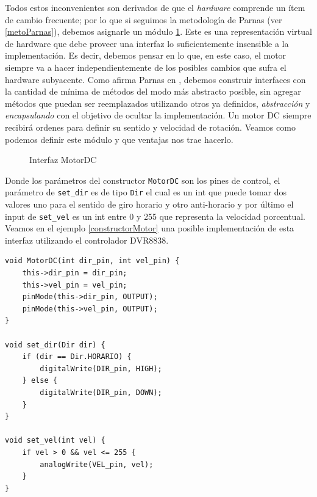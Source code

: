 Todos estos inconvenientes son derivados de que el \textit{hardware} comprende un ítem de cambio frecuente; por lo que si seguimos la metodología de Parnas (ver \ref{metoParnas}), debemos asignarle un módulo \ref{interfazMotor}. Este es una representación virtual de hardware que debe proveer una interfaz lo suficientemente insensible a la implementación. Es decir, debemos pensar en lo que, en este caso, el motor siempre va a hacer independientemente de los posibles cambios que sufra el hardware subyacente. Como afirma Parnas en \cite{Parnas02, parnas1977abstract}, debemos construir interfaces con la cantidad de mínima de métodos del modo más abstracto posible, sin agregar métodos que puedan ser reemplazados utilizando otros ya definidos, \textit{abstracción} y \textit{encapsulando} con el objetivo de ocultar la implementación.
Un motor DC siempre recibirá ordenes para definir su sentido y velocidad de rotación. Veamos como podemos definir este módulo y que ventajas nos trae hacerlo.

\begin{figure}
\caption{Interfaz MotorDC}
\label{interfazMotor}
\begin{center}
\end{center}
\end{figure}

Donde los parámetros del constructor \verb|MotorDC| son los pines de control, el parámetro de \verb|set_dir| es de tipo \verb|Dir| el cual es un int que puede tomar dos valores uno para el sentido de giro horario y otro anti-horario y por último el input de \verb|set_vel| es un int entre 0 y 255 que representa la velocidad porcentual. Veamos en el ejemplo \ref{constructorMotor} una posible implementación de esta interfaz utilizando el controlador DVR8838.

\begin{lstlisting}[caption=Posible implementación de la interfaz del módulo MotorDC,label={constructorMotor}]
void MotorDC(int dir_pin, int vel_pin) {
    this->dir_pin = dir_pin;
    this->vel_pin = vel_pin;
    pinMode(this->dir_pin, OUTPUT);
    pinMode(this->vel_pin, OUTPUT);
}

void set_dir(Dir dir) {
    if (dir == Dir.HORARIO) {
        digitalWrite(DIR_pin, HIGH);
    } else {
        digitalWrite(DIR_pin, DOWN);
    }
}

void set_vel(int vel) {
    if vel > 0 && vel <= 255 {
        analogWrite(VEL_pin, vel);
    }
}
\end{lstlisting}

